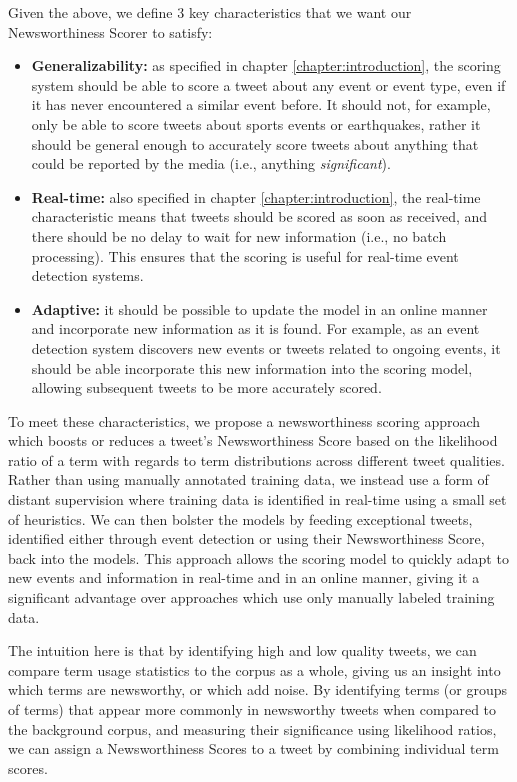 Given the above, we define 3 key characteristics that we want our Newsworthiness Scorer to satisfy:
\begin{itemize}
	\item \textbf{Generalizability:} as specified in chapter \ref{chapter:introduction}, the scoring system should be able to score a tweet about any event or event type, even if it has never encountered a similar event before. It should not, for example, only be able to score tweets about sports events or earthquakes, rather it should be general enough to accurately score tweets about anything that could be reported by the media (i.e., anything \emph{significant}).
	\item \textbf{Real-time:} also specified in chapter \ref{chapter:introduction}, the real-time characteristic means that tweets should be scored as soon as received, and there should be no delay to wait for new information (i.e., no batch processing). This ensures that the scoring is useful for real-time event detection systems.
	\item \textbf{Adaptive:} it should be possible to update the model in an online manner and incorporate new information as it is found. For example, as an event detection system discovers new events or tweets related to ongoing events, it should be able incorporate this new information into the scoring model, allowing subsequent tweets to be more accurately scored.
\end{itemize}

To meet these characteristics, we propose a newsworthiness scoring approach which boosts or reduces a tweet's Newsworthiness Score based on the likelihood ratio of a term with regards to term distributions across different tweet qualities.
Rather than using manually annotated training data, we instead use a form of distant supervision where training data is identified in real-time using a small set of heuristics.
We can then bolster the models by feeding exceptional tweets, identified either through event detection or using their Newsworthiness Score, back into the models.
This approach allows the scoring model to quickly adapt to new events and information in real-time and in an online manner, giving it a significant advantage over approaches which use only manually labeled training data.

The intuition here is that by identifying high and low quality tweets, we can compare term usage statistics to the corpus as a whole, giving us an insight into which terms are newsworthy, or which add noise.
By identifying terms (or groups of terms) that appear more commonly in newsworthy tweets when compared to the background corpus, and measuring their significance using likelihood ratios, we can assign a Newsworthiness Scores to a tweet by combining individual term scores.


